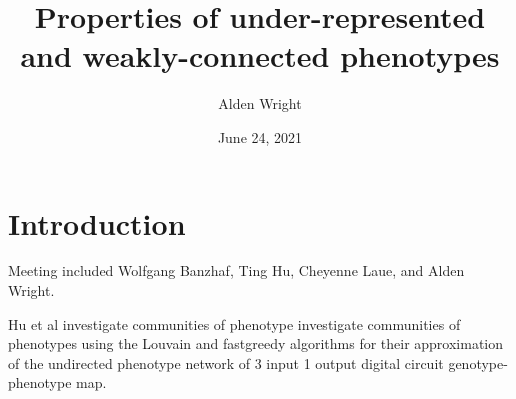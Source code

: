 \documentclass{article}
\title{Properties of under-represented and weakly-connected phenotypes}
\author{Alden Wright }
\date{June 24, 2021}
\begin{document}
\maketitle

\section*{Introduction}
Meeting included Wolfgang Banzhaf, Ting Hu, Cheyenne Laue, and Alden Wright.

Hu et al \citep{Hu2020} investigate communities of phenotype investigate communities of phenotypes
using the Louvain and fastgreedy algorithms for their approximation of the undirected phenotype 
network of 3 input 1 output digital circuit genotype-phenotype map.  






\end{document}
